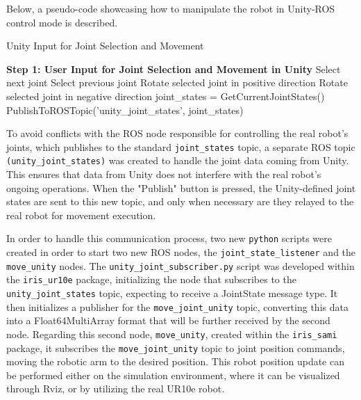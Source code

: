     Below, a pseudo-code showcasing how to manipulate the robot in Unity-ROS control mode is described.
    \begin{algorithm}
        \caption{Unity Input for Joint Selection and Movement}\label{alg:unity_input}
        \begin{algorithmic}[1]
            \State \textbf{Step 1: User Input for Joint Selection and Movement in Unity}
                    \State Select next joint
                    \State Select previous joint
                \EndIf
                    \State Rotate selected joint in positive direction
                    \State Rotate selected joint in negative direction
                \EndIf
                    \State joint\_states = GetCurrentJointStates()
                    \State PublishToROSTopic('unity\_joint\_states', joint\_states)
                \EndIf
            \EndWhile
        \end{algorithmic}
    \end{algorithm}

    To avoid conflicts with the \ac{ROS} node responsible for controlling the real robot's joints, which publishes to the standard \texttt{joint\_states} topic, a separate \ac{ROS} topic \texttt{(unity\_joint\_states)} was created to handle the joint data coming from Unity. This ensures that data from Unity does not interfere with the real robot’s ongoing operations. When the "Publish" button is pressed, the Unity-defined joint states are sent to this new topic, and only when necessary are they relayed to the real robot for movement execution. 
    
    In order to handle this communication process, two new \texttt{python} scripts were created in order to start two new \ac{ROS} nodes, the \texttt{joint\_state\_listener} and the \texttt{move\_unity} nodes. The \texttt{unity\_joint\_subscriber.py} script was developed within the \texttt{iris\_ur10e} package, initializing the node that subscribes to the \texttt{unity\_joint\_states} topic, expecting to receive a JointState message type. It then initializes a publisher for the \texttt{move\_joint\_unity} topic, converting this data into a Float64MultiArray format that will be further received by the second node. Regarding this second node, \texttt{move\_unity}, created within the \texttt{iris\_sami} package, it subscribes the \texttt{move\_joint\_unity} topic  to joint position commands, moving the robotic arm to the desired position. This robot position update can be performed either on the simulation environment, where it can be visualized through Rviz, or by utilizing the real UR10e robot. 
    
